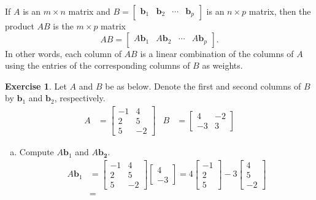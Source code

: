 \documentclass[10pt]{book}
\newcommand{\boxcolor}{gray!30}
\newenvironment{boxme}{\begin{mdframed}[backgroundcolor=\boxcolor,linewidth=0pt,nobreak=true]}{\end{mdframed}}
\theoremstyle{definition}
\newtheorem{exercise}{Exercise}[section]
\newcommand{\vect}[1]{\ensuremath{\boldsymbol{\mathbf{#1}}}}
\begin{document}
\begin{boxme}
	If $A$ is an $m\times n$ matrix and $B=\begin{bmatrix}\vect{b}_1&\vect{b}_2&\cdots&\vect{b}_p\end{bmatrix}$ is an $n\times p$ matrix, then the product $AB$ is the $m\times p$ matrix
	$$ AB = \begin{bmatrix}A\vect{b}_1&A\vect{b}_2&\cdots&A\vect{b}_p\end{bmatrix}. $$
	In other words, each column of $AB$ is a linear combination of the columns of $A$ using the entries of the corresponding columns of $B$ as weights.
\end{boxme}
\begin{exercise} %
	Let $A$ and $B$ be as below. Denote the first and second columns of $B$ by $\vect{b}_1$ and $\vect{b}_2$, respectively.
	\begin{align*}
	A &= \begin{bmatrix}-1&4\\2&5\\5&-2\end{bmatrix} &
	B &= \begin{bmatrix}4&-2\\-3&3\end{bmatrix}
	\end{align*}
	\begin{multicols}{2}
		\begin{enumerate}[(a)]
			\item Compute $A\vect{b}_1$ and $A\vect{b_2}$.
			\begin{align*}
			A\vect{b}_1 &=
			\begin{bmatrix}-1&4\\2&5\\5&-2\end{bmatrix}
			\begin{bmatrix}4\\-3\end{bmatrix}
			= 4\begin{bmatrix}-1\\2\\5\end{bmatrix}
			-3\begin{bmatrix}4\\5\\-2\end{bmatrix} \\
			&=

\end{align*}
\end{enumerate}
\end{multicols}
\end{exercise}
\end{document}
